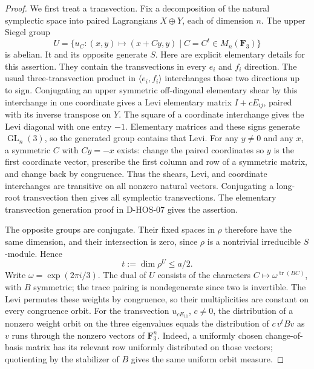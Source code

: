 \begin{proof}
We first treat a transvection. Fix a decomposition of the natural
symplectic space into paired Lagrangians $X\oplus Y$, each of dimension
$n$. The upper Siegel group
\[
 U=\{u_C:(x,y)\mapsto(x+Cy,y)\mid C=C^t\in M_n(\mathbf F_3)\}
 \tag{HOS3C.3}
\]
is abelian. It and its opposite generate $S$. Here are explicit
elementary details for this assertion. They contain the transvections
in every $e_i$ and $f_i$ direction. The usual three-transvection
product in $\langle e_i,f_i\rangle$ interchanges those two directions
up to sign. Conjugating an upper symmetric off-diagonal elementary
shear by this interchange in one coordinate gives a Levi elementary
matrix $I+cE_{ij}$, paired with its inverse transpose on $Y$.
The square of a coordinate interchange gives the Levi diagonal with
one entry $-1$. Elementary matrices and these signs generate
$\operatorname{GL}_n(3)$, so the generated group contains that Levi.
For any $y\ne0$ and any $x$, a symmetric $C$ with $Cy=-x$ exists:
change the paired coordinates so $y$ is the first coordinate vector,
prescribe the first column and row of a symmetric matrix, and change
back by congruence. Thus the shears, Levi, and coordinate interchanges
are transitive on all nonzero natural vectors. Conjugating a long-root
transvection then gives all symplectic transvections. The elementary
transvection generation proof in D-HOS-07 gives the assertion.

The opposite groups are conjugate. Their fixed spaces in $\rho$
therefore have the same dimension, and their intersection is zero,
since $\rho$ is a nontrivial irreducible $S$-module. Hence
\[
                             t:=\dim\rho^U\le a/2.
 \tag{HOS3C.4}
\]
Write $\omega=\exp(2\pi i/3)$. The dual of $U$ consists of the
characters $C\mapsto\omega^{\operatorname{tr}(BC)}$, with $B$
symmetric; the trace pairing is nondegenerate since two is invertible.
The Levi permutes these weights by congruence, so their multiplicities
are constant on every congruence orbit. For the transvection
$u_{cE_{11}}$, $c\ne0$, the distribution of a nonzero weight orbit
on the three eigenvalues equals the distribution of
$c\,v^tBv$ as $v$ runs through the nonzero vectors of $\mathbf F_3^n$.
Indeed, a uniformly chosen change-of-basis matrix has its relevant
row uniformly distributed on those vectors; quotienting by the
stabilizer of $B$ gives the same uniform orbit measure.


\end{proof}
